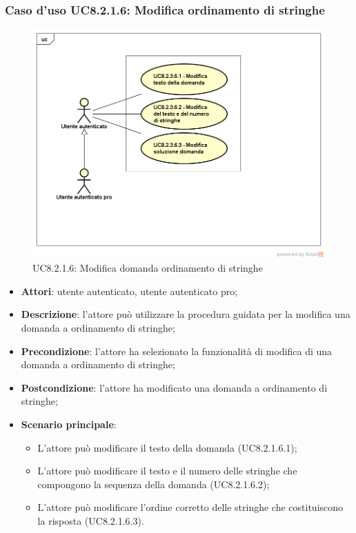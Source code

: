 \subsubsection{Caso d’uso UC8.2.1.6: Modifica ordinamento di stringhe}
	\label{UC8.2.1.6}
	\begin{figure}[h]
		\centering
		\includegraphics[scale=0.45,keepaspectratio]{UML/UC8_2_3_6.png}
		\caption{UC8.2.1.6: Modifica domanda ordinamento di stringhe}
	\end{figure}
	\FloatBarrier
\begin{itemize}
	\item\textbf{Attori}: utente autenticato, utente autenticato pro;
	\item\textbf{Descrizione}: l'attore può utilizzare la procedura guidata per la modifica una domanda a ordinamento di stringhe;
	\item\textbf{Precondizione}: l'attore ha selezionato la funzionalità di modifica di una domanda a ordinamento di stringhe;
	\item \textbf{Postcondizione}: l'attore ha modificato una domanda a ordinamento di stringhe;
	\item\textbf{Scenario principale}:
		\begin{itemize}
			\item L'attore può modificare il testo della domanda (UC8.2.1.6.1);
			\item L'attore può modificare il testo e il numero delle stringhe che compongono la sequenza della domanda (UC8.2.1.6.2);
			\item L'attore può modificare l'ordine corretto delle stringhe che costituiscono la risposta (UC8.2.1.6.3).
		\end{itemize}
\end{itemize}

